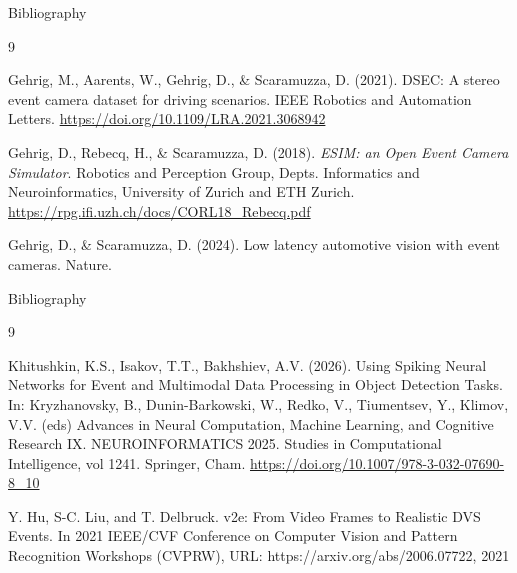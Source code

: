 \documentclass[10pt,xcolor=x11names,compress]{beamer}
\begin{document}
\begin{frame}{Bibliography}
  \begin{thebibliography}{9}

   Gehrig, M., Aarents, W., Gehrig, D., & Scaramuzza, D. (2021). DSEC: A stereo event camera dataset for driving scenarios. IEEE Robotics and Automation Letters. \url{https://doi.org/10.1109/LRA.2021.3068942}
    
   Gehrig, D., Rebecq, H., \& Scaramuzza, D. (2018). \textit{ESIM: an Open Event Camera Simulator}. Robotics and Perception Group, Depts. Informatics and Neuroinformatics, University of Zurich and ETH Zurich. \url{https://rpg.ifi.uzh.ch/docs/CORL18_Rebecq.pdf}

   Gehrig, D., & Scaramuzza, D. (2024). Low latency automotive vision with event cameras. Nature.

  \end{thebibliography}
  
\end{frame}
\begin{frame}{Bibliography}
  \begin{thebibliography}{9}
    
   Khitushkin, K.S., Isakov, T.T., Bakhshiev, A.V. (2026). Using Spiking Neural Networks for Event and Multimodal Data Processing in Object Detection Tasks. In: Kryzhanovsky, B., Dunin-Barkowski, W., Redko, V., Tiumentsev, Y., Klimov, V.V. (eds) Advances in Neural Computation, Machine Learning, and Cognitive Research IX. NEUROINFORMATICS 2025. Studies in Computational Intelligence, vol 1241. Springer, Cham. \url{https://doi.org/10.1007/978-3-032-07690-8_10}

   Y. Hu, S-C. Liu, and T. Delbruck. v2e: From Video Frames to Realistic DVS Events. In 2021 IEEE/CVF Conference on Computer Vision and Pattern Recognition Workshops (CVPRW), URL: https://arxiv.org/abs/2006.07722, 2021
    
  \end{thebibliography}
  
\end{frame}
\end{document}
